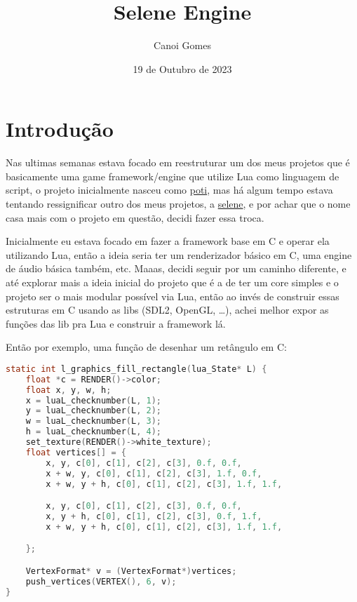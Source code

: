 \documentclass[a4paper,oneside,12pt]{article}
\title{Selene Engine}
\author{Canoi Gomes}
\date{19 de Outubro de 2023}
\begin{document}
\maketitle
\newpage

\tableofcontents
\newpage

\section{Introdução}

Nas ultimas semanas estava focado em reestruturar um dos meus projetos que é basicamente uma game framework/engine que utilize Lua como linguagem de script, o projeto inicialmente nasceu como \href{https://github.com/canoi12/poti}{poti}, mas há algum tempo estava tentando ressignificar outro dos meus projetos, a \href{https://github.com/canoi12/selene}{selene}, e por achar que o nome casa mais com o projeto em questão, decidi fazer essa troca.

Inicialmente eu estava focado em fazer a framework base em C e operar ela utilizando Lua, então a ideia seria ter um renderizador básico em C, uma engine de áudio básica também, etc. Maaas, decidi seguir por um caminho diferente, e até explorar mais a ideia inicial do projeto que é a de ter um core simples e o projeto ser o mais modular possível via Lua, então ao invés de construir essas estruturas em C usando as libs (SDL2, OpenGL, …), achei melhor expor as funções das lib pra Lua e construir a framework lá.

Então por exemplo, uma função de desenhar um retângulo em C:

\begin{lstlisting}[language=C]
static int l_graphics_fill_rectangle(lua_State* L) {
    float *c = RENDER()->color;
    float x, y, w, h;
    x = luaL_checknumber(L, 1);
    y = luaL_checknumber(L, 2);
    w = luaL_checknumber(L, 3);
    h = luaL_checknumber(L, 4);
    set_texture(RENDER()->white_texture);
    float vertices[] = {
        x, y, c[0], c[1], c[2], c[3], 0.f, 0.f,
        x + w, y, c[0], c[1], c[2], c[3], 1.f, 0.f,
        x + w, y + h, c[0], c[1], c[2], c[3], 1.f, 1.f,

        x, y, c[0], c[1], c[2], c[3], 0.f, 0.f,
        x, y + h, c[0], c[1], c[2], c[3], 0.f, 1.f,
        x + w, y + h, c[0], c[1], c[2], c[3], 1.f, 1.f,

    };

    VertexFormat* v = (VertexFormat*)vertices;
    push_vertices(VERTEX(), 6, v);
}
\end{lstlisting}
\end{document}
